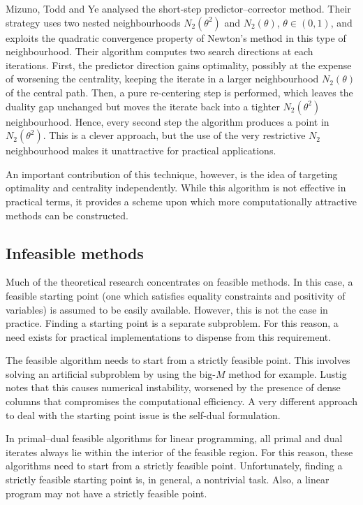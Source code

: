 Mizuno, Todd and Ye \cite{MizunoToddYe} analysed the short-step 
predictor--corrector method. Their strategy uses two nested neighbourhoods 
$N_2(\theta^2)$ and $N_2(\theta)$, $\theta \in (0,1)$, and exploits the
quadratic convergence property of Newton's method in this type of 
neighbourhood.
Their algorithm computes two search directions at each iterations.
First, the predictor direction gains optimality, possibly at the expense of
worsening the centrality, keeping the iterate in a larger neighbourhood
$N_2(\theta)$ of the central path. Then, a pure re-centering step 
is performed, which leaves the duality gap unchanged but 
moves the iterate back into a 
tighter $N_2(\theta^2)$ neighbourhood. Hence, every second step the 
algorithm produces a point in $N_2(\theta^2)$. This is a clever 
approach, but the use of the very restrictive $N_2$ neighbourhood 
makes it unattractive for practical applications.

An important contribution of this technique, however, is the idea 
of targeting optimality and centrality independently. While this 
algorithm is not effective in practical terms, it provides a scheme 
upon which more computationally attractive methods can be constructed.


%
%
\subsection{Infeasible methods}

Much of the theoretical research concentrates on feasible 
methods. In this case, a feasible starting point (one which 
satisfies equality constraints and positivity of variables) 
is assumed to be easily available. However, this is not the 
case in practice. Finding a starting point is a separate 
subproblem. For this reason, a need exists for practical 
implementations to dispense from this requirement.

The feasible algorithm needs to start from a strictly feasible 
point. This involves solving an artificial subproblem by using 
the big-$M$ method for example. Lustig \cite{Lustig91}
notes that this causes numerical instability, worsened 
by the presence of dense columns that compromises the 
computational efficiency. A very different approach to deal 
with the starting point issue is the self-dual formulation.

\hrulefill

In primal--dual feasible algorithms for linear programming, 
all primal and dual iterates always lie within the interior 
of the feasible region. For this reason, these algorithms 
need to start from a strictly feasible point. Unfortunately, 
finding a strictly feasible starting point is, in general, 
a nontrivial task. Also, a linear program may not have a 
strictly feasible point.

